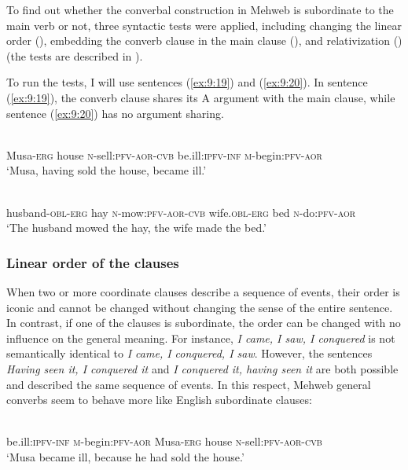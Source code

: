 ﻿\documentclass[output=paper]{langsci/langscibook}
\begin{document}
To find out whether the converbal construction in Mehweb is subordinate
to the main verb or not, three syntactic tests were applied, 
including changing the linear order (),
embedding
the converb clause in the main clause (), and relativization
() (the tests are described in \citealt[143–145]{creissels2012}).

To run the tests, I will use sentences (\ref{ex:9:19}) and (\ref{ex:9:20}). In sentence (\ref{ex:9:19}), the
converb clause shares its A argument with the main clause, while
sentence (\ref{ex:9:20}) has no argument sharing.

\ea \label{ex:9:19} %
\\
Musa-\textsc{erg} house \textsc{n}-sell:\textsc{pfv}-\textsc{aor}-\textsc{cvb} be.ill:\textsc{ipfv}-\textsc{inf} \textsc{m}-begin:\textsc{pfv}-\textsc{aor}\\\unskip
\glt `Musa, having sold the house, became ill.'

\ex \label{ex:9:20} %
\\
husband-\textsc{obl}-\textsc{erg} hay \textsc{n}-mow:\textsc{pfv}-\textsc{aor}-\textsc{cvb} wife.\textsc{obl}-\textsc{erg} bed \textsc{n}-do:\textsc{pfv}-\textsc{aor}\\
\glt `The husband mowed the hay, the wife made the bed.'
\z

\subsubsection{Linear order of the clauses}\label{linear-order-of-the-clauses}

When two or more coordinate clauses describe a sequence of events, their
order is iconic and cannot be changed without changing the sense of the
entire sentence. In contrast, if one of the clauses is subordinate, the
order can be changed with no influence on the general meaning. For
instance, \emph{I came, I saw, I conquered} is not semantically
identical to \emph{I came, I conquered, I saw}. However, the sentences
\emph{Having seen it, I conquered it} and \emph{I conquered it, having seen it} are
both possible and described the same sequence of events. In this respect, Mehweb
general converbs seem to behave more like English subordinate clauses:

\ea \label{ex:9:21} %
\\
be.ill:\textsc{ipfv}-\textsc{inf} \textsc{m}-begin:\textsc{pfv}-\textsc{aor} Musa-\textsc{erg} house \textsc{n}-sell:\textsc{pfv}-\textsc{aor}-\textsc{cvb}\\\unskip
\glt `Musa became ill, because he had sold the house.'
\end{document}
